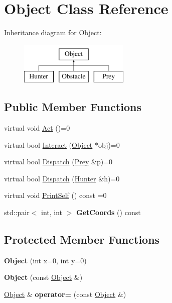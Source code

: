 \hypertarget{classObject}{
\section{Object Class Reference}
\label{classObject}
}
Inheritance diagram for Object:\begin{figure}[H]
\begin{center}
\leavevmode
\includegraphics[height=2cm]{classObject}
\end{center}
\end{figure}
\subsection*{Public Member Functions}
\begin{DoxyCompactItemize}
\item 
virtual void \hyperlink{classObject_a683b351ee47dc69c4117cb9017c467d6}{Act} ()=0
\item 
virtual bool \hyperlink{classObject_a27d03e80827229de2ce885a0bc1c83c0}{Interact} (\hyperlink{classObject}{Object} $\ast$obj)=0
\item 
virtual bool \hyperlink{classObject_a70097e3ad4433aec0dd0b938fcedfeca}{Dispatch} (\hyperlink{classPrey}{Prey} \&p)=0
\item 
virtual bool \hyperlink{classObject_a0d0e1f0456837f6736913b1ba374f11d}{Dispatch} (\hyperlink{classHunter}{Hunter} \&h)=0
\item 
virtual void \hyperlink{classObject_a2c63e79dfa8626451b4a04b0b72294eb}{PrintSelf} () const =0
\item 
\hypertarget{classObject_acff116bb4de4bb36b38d0469defed939}{
std::pair$<$ int, int $>$ {\bfseries GetCoords} () const }
\label{classObject_acff116bb4de4bb36b38d0469defed939}

\end{DoxyCompactItemize}
\subsection*{Protected Member Functions}
\begin{DoxyCompactItemize}
\item 
\hypertarget{classObject_ad2977e29718433084247cb65894c93af}{
{\bfseries Object} (int x=0, int y=0)}
\label{classObject_ad2977e29718433084247cb65894c93af}

\item 
\hypertarget{classObject_af3b5cd7a9a24ddde484344200cf83281}{
{\bfseries Object} (const \hyperlink{classObject}{Object} \&)}
\label{classObject_af3b5cd7a9a24ddde484344200cf83281}

\item 
\hypertarget{classObject_aef3f27c97a56ab9096bc2cbc6c850bc7}{
\hyperlink{classObject}{Object} \& {\bfseries operator=} (const \hyperlink{classObject}{Object} \&)}
\label{classObject_aef3f27c97a56ab9096bc2cbc6c850bc7}

\end{DoxyCompactItemize}

